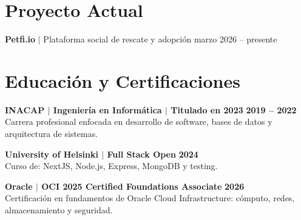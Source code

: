 
\resumeItemListEnd

\resumeSubHeadingListEnd

\section{Proyecto Actual}

\resumeSubHeadingListStart

\resumeProjectHeading
{\textbf{Petfi.io} $|$ Plataforma social de rescate y adopción}
{marzo 2026 -- presente}
\resumeItemListStart


\resumeItemListEnd

\resumeSubHeadingListEnd
\vspace{-6pt}

\section{Educación y Certificaciones}

\noindent\textbf{INACAP $|$ Ingeniería en Informática $|$ Titulado en 2023}
\hfill
\textbf{2019 -- 2022} \\
{\small Carrera profesional enfocada en desarrollo de software,
        bases de datos y
arquitectura de sistemas.}
\par\vspace{1pt}

\noindent\textbf{University of Helsinki $|$ Full Stack Open} \hfill
\textbf{2024} \\
{\small Curso de: NextJS, Node.js, Express, MongoDB y testing.}
\par\vspace{1pt}

\noindent\textbf{Oracle $|$ OCI 2025 Certified Foundations Associate} \hfill
\textbf{2026} \\
{\small Certificación en fundamentos de Oracle Cloud Infrastructure:
        cómputo, redes,
almacenamiento y seguridad.}

\vspace{-6pt}
